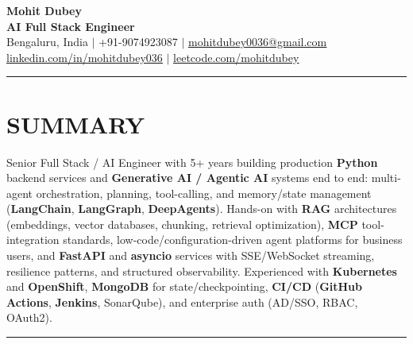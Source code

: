\documentclass[a4paper]{article}
\newcommand{\sectionline}{
\begin{center}
\vspace{-9pt}
\rule{1\textwidth}{0.5pt}
\end{center}
\vspace{1pt}
}
\begin{document}
\begin{center}
    \textbf{\Huge Mohit Dubey} \\ \vspace{4pt}
    \textbf{AI Full Stack Engineer } \\ \vspace{6pt}
    \small Bengaluru, India $|$ +91-9074923087 $|$ \href{mailto:mohitdubey0036@gmail.com}{\underline{mohitdubey0036@gmail.com}} \\
    \href{https://www.linkedin.com/in/mohit-dubey-036/}{\underline{linkedin.com/in/mohitdubey036}} $|$ \href{https://leetcode.com/u/mohitdubey036/}
    {\underline{leetcode.com/mohitdubey}}
\end{center}


\sectionline
\section*{SUMMARY}
Senior Full Stack / AI Engineer with 5+ years building production \textbf{Python} backend services and \textbf{Generative AI / Agentic AI} systems end to end: multi-agent orchestration, planning, tool-calling, and memory/state management (\textbf{LangChain}, \textbf{LangGraph}, \textbf{DeepAgents}). Hands-on with \textbf{RAG} architectures (embeddings, vector databases, chunking, retrieval optimization), \textbf{MCP} tool-integration standards, low-code/configuration-driven agent platforms for business users, and \textbf{FastAPI} and \textbf{asyncio} services with SSE/WebSocket streaming, resilience patterns, and structured observability. Experienced with \textbf{Kubernetes} and \textbf{OpenShift}, \textbf{MongoDB} for state/checkpointing, \textbf{CI/CD} (\textbf{GitHub Actions}, \textbf{Jenkins}, SonarQube), and enterprise auth (AD/SSO, RBAC, OAuth2).

\sectionline
\end{document}
